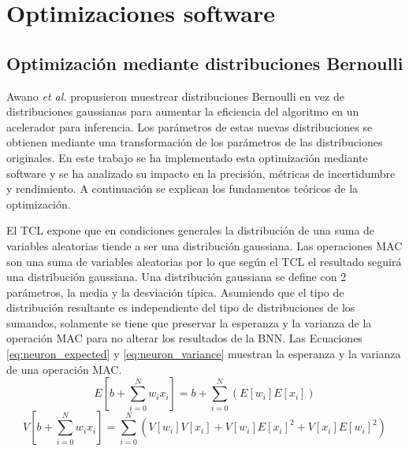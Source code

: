 \chapter{Optimizaciones software} \label{ch:optimizaciones}

\section{Optimización mediante distribuciones Bernoulli}

Awano \emph{et al.} \cite{bnn_clt_approx} propusieron muestrear distribuciones Bernoulli en vez de distribuciones gaussianas para aumentar la eficiencia del algoritmo en un acelerador para inferencia. Los parámetros de estas nuevas distribuciones se obtienen mediante una transformación de los parámetros de las distribuciones originales. En este trabajo se ha implementado esta optimización mediante software y se ha analizado su impacto en la precisión, métricas de incertidumbre y rendimiento. A continuación se explican los fundamentos teóricos de la optimización.

El TCL expone que en condiciones generales la distribución de una suma de variables aleatorias tiende a ser una distribución gaussiana. Las operaciones MAC son una suma de variables aleatorias por lo que según el TCL el resultado seguirá una distribución gaussiana. Una distribución gaussiana se define con 2 parámetros, la media y la desviación típica. Asumiendo que el tipo de distribución resultante es independiente del tipo de distribuciones de los sumandos, solamente se tiene que preservar la esperanza y la varianza de la operación MAC para no alterar los resultados de la BNN. Las Ecuaciones \ref{eq:neuron_expected}  y \ref{eq:neuron_variance} muestran la esperanza y la varianza de una operación MAC.
\begin{equation} \label{eq:neuron_expected}
E\left[ b + \sum_{i=0}^N w_i x_i \right]  = b + \sum_{i=0}^N ( E[w_i] E[x_i] )
\end{equation}
\begin{equation} \label{eq:neuron_variance}
V\left[ b + \sum_{i=0}^N w_i x_i \right] = \sum_{i=0}^N ( V[w_i]V[x_i] + V[w_i]E[x_i]^2 + V[x_i]E[w_i]^2 )
\end{equation}

